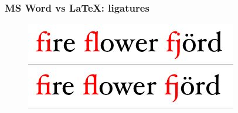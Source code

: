 \documentclass{beamer}
\begin{document}

\begin{frame}
\frametitle{MS Word vs \LaTeX: ligatures}



\begin{figure}[h]

\begin{center}
  \centering
	\includegraphics[scale=0.70,clip=true]{figs/ligatures_word.jpg} \\
	\bigskip
	\includegraphics[scale=0.70,clip=true]{figs/ligatures_latex.jpg} \\
	\pause
\end{center}
\end{figure}



\end{frame}

\end{document}
